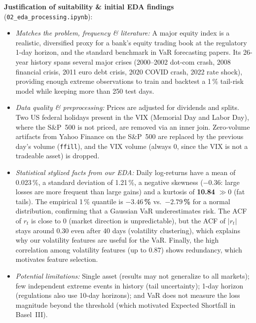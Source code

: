 \documentclass[10pt,a4paper]{article}
\newcommand{\code}[1]{\texttt{\small #1}}
\begin{document}
\textbf{Justification of suitability \& initial EDA findings} (\code{02\_eda\_processing.ipynb}):
\begin{itemize}
  \item \emph{Matches the problem, frequency \& literature:} A major equity index is a realistic, diversified proxy for a bank's equity trading book at the regulatory 1-day horizon, and the standard benchmark in VaR forecasting papers. Its 26-year history spans several major crises (2000--2002 dot-com crash, 2008 financial crisis, 2011 euro debt crisis, 2020 COVID crash, 2022 rate shock), providing enough extreme observations to train and backtest a 1\,\% tail-risk model while keeping more than 250 test days.
  \item \emph{Data quality \& preprocessing:} Prices are adjusted for dividends and splits. Two US federal holidays present in the VIX (Memorial Day and Labor Day), where the S\&P~500 is not priced, are removed via an inner join. Zero-volume artifacts from Yahoo Finance on the S\&P~500 are replaced by the previous day's volume (\code{ffill}), and the VIX volume (always 0, since the VIX is not a tradeable asset) is dropped.
  \item \emph{Statistical stylized facts from our EDA:} Daily log-returns have a mean of 0.023\,\%, a standard deviation of 1.21\,\%, a negative skewness ($-0.36$: large losses are more frequent than large gains) and a kurtosis of \textbf{10.84} $\gg 0$ (fat tails). The empirical 1\,\% quantile is \textbf{$-3.46$\,\%} vs.\ \textbf{$-2.79$\,\%} for a normal distribution, confirming that a Gaussian VaR underestimates risk. The ACF of $r_t$ is close to 0 (market direction is unpredictable), but the ACF of $|r_t|$ stays around 0.30 even after 40 days (volatility clustering), which explains why our volatility features are useful for the VaR. Finally, the high correlation among volatility features (up to 0.87) shows redundancy, which motivates feature selection.
  \item \emph{Potential limitations:} Single asset (results may not generalize to all markets); few independent extreme events in history (tail uncertainty); 1-day horizon (regulations also use 10-day horizons); and VaR does not measure the loss magnitude beyond the threshold (which motivated Expected Shortfall in Basel~III).
\end{itemize}

\end{document}

